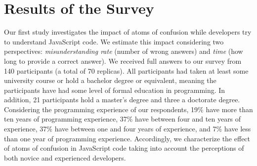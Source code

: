 

\section{Results of the Survey}
\label{sec:survey-resuts} 

Our first study investigates the impact of atoms of confusion while developers try to understand JavaScript code.
We estimate this impact considering two perspectives: \emph{misunderstanding rate} (number of wrong answers)
and \emph{time} (how long to provide a correct answer).
We received full answers to our survey from 140 participants (a total of 70 replicas).
All participants had taken at least some university course or hold a bachelor
degree or equivalent, meaning the participants have had some level of formal education in programming. In addition, 21 participants hold a master's degree and three a doctorate degree. 
Considering the programming experience of our respondents, 19\% have more than ten years of programming experience, 37\% have between four and ten years of experience, 37\% have between one and four years of experience, and 7\% have less than one year of programming experience.  
Accordingly, we characterize the effect of atoms of confusion in JavaScript
code taking into account the perceptions of both novice and experienced developers. 





